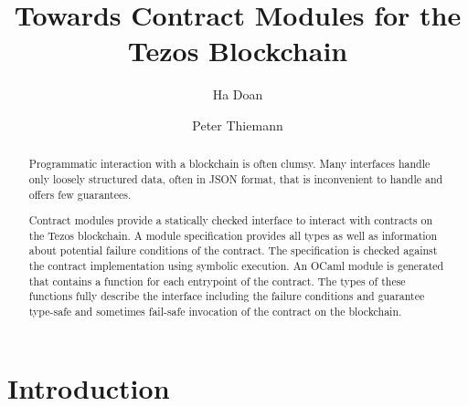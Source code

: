\documentclass[a4paper,USenglish,american,cleveref, autoref, thm-restate]{oasics-v2021}
\title{Towards Contract Modules for the Tezos Blockchain} %
\author{Ha Doan}{University of Freiburg, Germany}{doanha@cs.uni-freiburg.de}{https://orcid.org/0000-0002-1825-0097}{(Optional) author-specific funding acknowledgements}%
\author{Peter Thiemann}{University of Freiburg, Germany}{thiemann@acm.org}{[orcid]}{[funding]}
\begin{document}
\maketitle

\begin{abstract}
  Programmatic interaction with a blockchain is often clumsy.
  Many interfaces handle only loosely structured data, often in JSON
  format, that is inconvenient to handle and offers few guarantees.

  Contract modules provide a statically checked interface to interact
  with contracts on the Tezos blockchain. A module specification
  provides all types as well as information about potential failure
  conditions of the contract. The specification is checked against the
  contract implementation using symbolic execution. An OCaml module is
  generated that contains a function for each entrypoint of the
  contract. The types of these functions fully describe the interface
  including the failure conditions and guarantee type-safe and
  sometimes fail-safe invocation of the contract on the blockchain.
\end{abstract}

\section{Introduction}
\label{sec:introduction}





\end{document}
